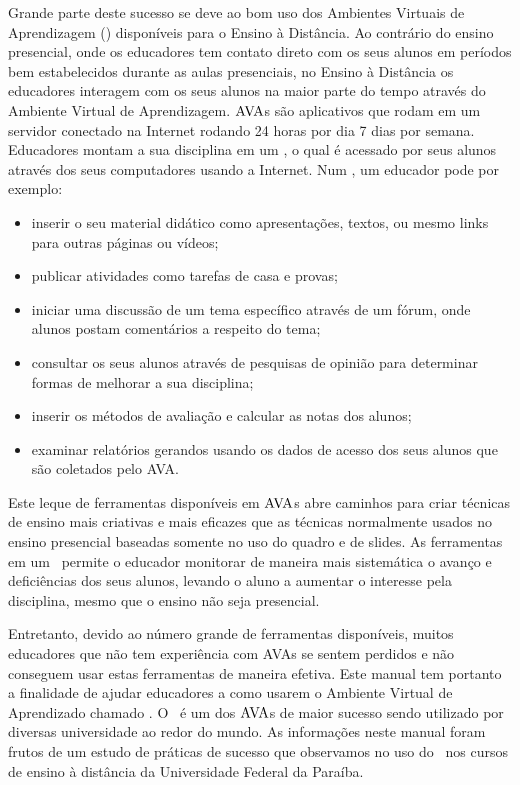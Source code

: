  

Grande parte deste sucesso se deve ao bom uso dos Ambientes Virtuais de Aprendizagem (\ava) disponíveis para
o Ensino à Distância. Ao contrário do ensino presencial, onde os educadores tem contato direto 
com os seus alunos em períodos bem estabelecidos durante as aulas presenciais, 
no Ensino à Distância os educadores interagem com os seus alunos na maior parte do tempo 
através do Ambiente Virtual de Aprendizagem. $\hbox{AVA}$s são aplicativos que rodam em um servidor 
conectado na Internet rodando 24 horas por dia 7 dias por semana. Educadores montam a sua disciplina em um \ava, o qual é acessado 
por seus alunos através dos seus computadores usando a Internet. Num \ava, um educador pode por exemplo:
\begin{itemize}
 \item inserir o seu material didático como apresentações, textos, ou mesmo links para outras páginas ou vídeos;
 \item publicar atividades como tarefas de casa e provas;
 \item iniciar uma discussão de um tema específico através de um fórum, onde alunos postam comentários a 
 respeito do tema;
 \item consultar os seus alunos através de pesquisas de opinião para determinar formas de melhorar a sua disciplina;
 \item inserir os métodos de avaliação e calcular as notas dos alunos;
 \item examinar relatórios gerandos usando os dados de acesso dos seus alunos que são 
coletados pelo AVA.
\end{itemize}
Este leque de ferramentas disponíveis em $\hbox{AVA}$s abre caminhos para criar técnicas de ensino 
mais criativas e mais eficazes que as técnicas normalmente usados no ensino presencial
baseadas somente no uso do quadro e de slides. As ferramentas em um \ava\ permite  
o educador monitorar de maneira mais sistemática o avanço e deficiências dos seus alunos, 
levando o aluno a aumentar o interesse pela disciplina, mesmo que o ensino não seja presencial. 

Entretanto, devido ao número grande de ferramentas disponíveis, muitos educadores que não tem experiência 
com AVAs se sentem perdidos e não conseguem usar estas ferramentas de maneira efetiva. 
Este manual tem portanto a finalidade de ajudar educadores a como usarem o Ambiente Virtual de Aprendizado
chamado \emph{\moodle}. O \moodle\ é um dos $\hbox{AVA}$s de maior sucesso sendo utilizado por diversas 
universidade ao redor do mundo. As informações neste manual foram frutos de um 
estudo de práticas de sucesso que observamos no uso do \moodle\ 
nos cursos de ensino à distância da Universidade Federal da Paraíba. 

